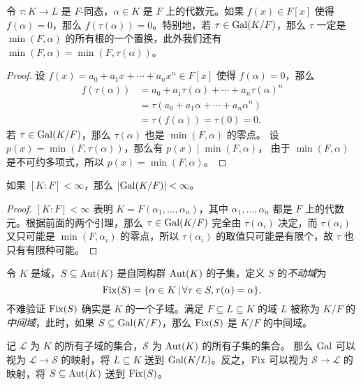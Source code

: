 \begin{lemma}\label{lemma:tau alpha is zero}
  令 $\tau:K\to L$ 是 $F$-同态，$\alpha\in K$ 是 $F$ 上的代数元。如果 $f(x)\in F[x]$
  使得 $f(\alpha)=0$，那么 $f(\tau(\alpha))=0$。特别地，若 $\tau\in\operatorname{Gal}(K/F)$，那么 $\tau$
  一定是 $\min(F,\alpha)$ 的所有根的一个置换，此外我们还有 $\min(F,\alpha)=\min (F,\tau(\alpha))$。
\end{lemma}
\begin{proof}
  设 $f(x)=a_0+a_1x+\cdots+a_nx^n\in F[x]$ 使得 $f(\alpha)=0$，那么
  \begin{align*}
    f(\tau(\alpha))&=a_0+a_1\tau(\alpha)+\cdots+a_n\tau(\alpha)^n  \\
    &=\tau(a_0+a_1\alpha+\cdots+a_n\alpha^n) \\
    &=\tau(f(\alpha))=\tau(0)=0.
  \end{align*}
  若 $\tau\in\operatorname{Gal}(K/F)$，那么 $\tau(\alpha)$ 也是 $\min(F,\alpha)$ 的零点。
  设 $p(x)=\min(F,\tau(\alpha))$，那么有 $p(x)\mid \min(F,\alpha)$，
  由于 $\min (F,\alpha)$ 是不可约多项式，所以 $p(x)=\min(F,\alpha)$。
\end{proof}

\begin{corollary}
  如果 $[K:F]<\infty$，那么 $\lvert\operatorname{Gal}(K/F)\rvert<\infty$。
\end{corollary}
\begin{proof}
  $[K:F]<\infty$ 表明 $K=F(\alpha_1,\dots,\alpha_n)$，其中 $\alpha_1,\dots,\alpha_n$
  都是 $F$ 上的代数元。根据前面的两个引理，那么 $\tau\in\operatorname{Gal}(K/F)$ 完全由 $\tau(\alpha_i)$
  决定，而 $\tau(\alpha_i)$ 又只可能是 $\min(F,\alpha_i)$ 的零点，所以 $\tau(\alpha_i)$
  的取值只可能是有限个，故 $\tau$ 也只有有限种可能。
\end{proof}

令 $K$ 是域，$S\subseteq \operatorname{Aut}(K)$ 是自同构群 $\operatorname{Aut}(K)$ 的子集，定义 $S$ 
的\emph{不动域}为
\[
  \operatorname{Fix}(S)=\{\alpha\in K\,|\, \forall\tau\in S,\tau(\alpha)=\alpha\}  .
\]
不难验证 $\operatorname{Fix}(S)$ 确实是 $K$ 的一个子域。满足 $F\subseteq L\subseteq K$
的域 $L$ 被称为 $K/F$ 的\emph{中间域}，此时，如果 $S\subseteq \operatorname{Gal}(K/F)$，那么
$\operatorname{Fix}(S)$ 是 $K/F$ 的中间域。

记 $\mathcal{L}$ 为 $K$ 的所有子域的集合，$\mathcal{S}$ 为 $\operatorname{Aut}(K)$ 的所有子集的集合。
那么 $\operatorname{Gal}$ 可以视为 $\mathcal{L}\to\mathcal{S}$ 的映射，将 $L\subseteq K$
送到 $\operatorname{Gal}(K/L)$。反之，$\operatorname{Fix}$ 可以视为 $\mathcal{S}\to\mathcal{L}$ 的映射，将
$S\subseteq\operatorname{Aut} (K)$ 送到 $\operatorname{Fix}(S)$。

